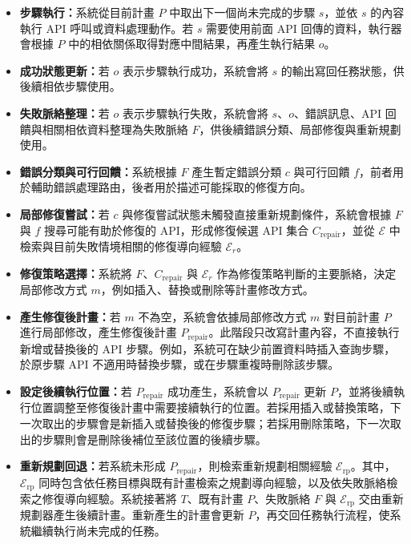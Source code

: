 \begin{ZhChapter}
\begin{enumerate}
    \begin{itemize}
        \item \textbf{步驟執行：}系統從目前計畫 \(P\) 中取出下一個尚未完成的步驟 \(s\)，並依 \(s\) 的內容執行 API 呼叫或資料處理動作。若 \(s\) 需要使用前面 API 回傳的資料，執行器會根據 \(P\) 中的相依關係取得對應中間結果，再產生執行結果 \(o\)。
        \item \textbf{成功狀態更新：}若 \(o\) 表示步驟執行成功，系統會將 \(s\) 的輸出寫回任務狀態，供後續相依步驟使用。
        \item \textbf{失敗脈絡整理：}若 \(o\) 表示步驟執行失敗，系統會將 \(s\)、\(o\)、錯誤訊息、API 回饋與相關相依資料整理為失敗脈絡 \(F\)，供後續錯誤分類、局部修復與重新規劃使用。
        \item \textbf{錯誤分類與可行回饋：}系統根據 \(F\) 產生暫定錯誤分類 \(c\) 與可行回饋 \(f\)，前者用於輔助錯誤處理路由，後者用於描述可能採取的修復方向。
        \item \textbf{局部修復嘗試：}若 \(c\) 與修復嘗試狀態未觸發直接重新規劃條件，系統會根據 \(F\) 與 \(f\) 搜尋可能有助於修復的 API，形成修復候選 API 集合 \(C_{\mathrm{repair}}\)，並從 \(\mathcal{E}\) 中檢索與目前失敗情境相關的修復導向經驗 \(\mathcal{E}_r\)。
        \item \textbf{修復策略選擇：}系統將 \(F\)、\(C_{\mathrm{repair}}\) 與 \(\mathcal{E}_r\) 作為修復策略判斷的主要脈絡，決定局部修改方式 \(m\)，例如插入、替換或刪除等計畫修改方式。
        \item \textbf{產生修復後計畫：}若 \(m\) 不為空，系統會依據局部修改方式 \(m\) 對目前計畫 \(P\) 進行局部修改，產生修復後計畫 \(P_{\mathrm{repair}}\)。此階段只改寫計畫內容，不直接執行新增或替換後的 API 步驟。例如，系統可在缺少前置資料時插入查詢步驟，於原步驟 API 不適用時替換步驟，或在步驟重複時刪除該步驟。
        \item \textbf{設定後續執行位置：}若 \(P_{\mathrm{repair}}\) 成功產生，系統會以 \(P_{\mathrm{repair}}\) 更新 \(P\)，並將後續執行位置調整至修復後計畫中需要接續執行的位置。若採用插入或替換策略，下一次取出的步驟會是新插入或替換後的修復步驟；若採用刪除策略，下一次取出的步驟則會是刪除後補位至該位置的後續步驟。
        \item \textbf{重新規劃回退：}若系統未形成 \(P_{\mathrm{repair}}\)，則檢索重新規劃相關經驗 \(\mathcal{E}_{\mathrm{rp}}\)。其中，\(\mathcal{E}_{\mathrm{rp}}\) 同時包含依任務目標與既有計畫檢索之規劃導向經驗，以及依失敗脈絡檢索之修復導向經驗。系統接著將 \(T\)、既有計畫 \(P\)、失敗脈絡 \(F\) 與 \(\mathcal{E}_{\mathrm{rp}}\) 交由重新規劃器產生後續計畫。重新產生的計畫會更新 \(P\)，再交回任務執行流程，使系統繼續執行尚未完成的任務。
    \end{itemize}


\end{enumerate}
\end{ZhChapter}
